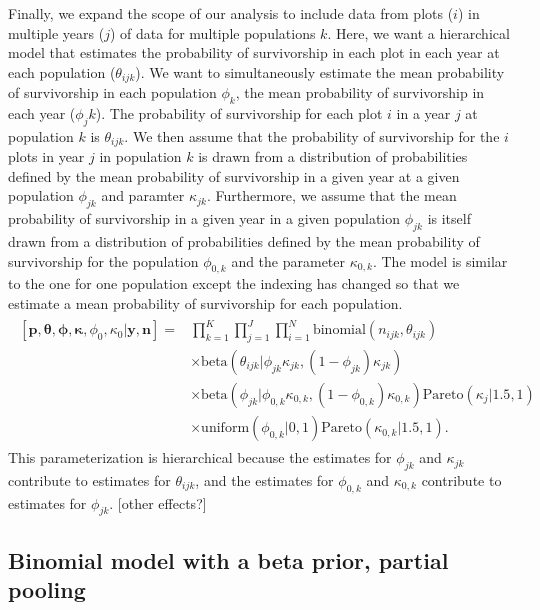 \documentclass[12pt, oneside, titlepage]{article}   	%
\begin{document}
Finally, we expand the scope of our analysis to include data from plots ($i$) in multiple years ($j$) of data for multiple populations $k$. Here, we want a hierarchical model that estimates the probability of survivorship in each plot in each year at each population ($\theta_{ijk}$). We want to simultaneously estimate the mean probability of survivorship in each population $\phi_k$, the mean probability of survivorship in each year ($\phi_jk$). The probability of survivorship for each plot $i$ in a year $j$ at population $k$ is $\theta_{ijk}$. We then assume that the probability of survivorship for the $i$ plots in year $j$ in population $k$ is drawn from a distribution of probabilities defined by the mean probability of survivorship in a given year at a given population $\phi_{jk}$ and paramter $\kappa_{jk}$. Furthermore, we assume that the mean probability of survivorship in a given year in a given population $\phi_{jk}$ is itself drawn from a distribution of probabilities defined by the mean probability of survivorship for the population $\phi_{0,k}$ and the parameter $\kappa_{0,k}$. The model is similar to the one for one population except the indexing has changed so that we estimate a mean probability of survivorship for each population.
%
\begin{align}
  \begin{split}
[\bm{p},\bm{\theta},\bm{\phi},\bm{\kappa},\phi_0,\kappa_0|\bm{y},\bm{n}]  = & \prod_{k=1}^K\prod_{j=1}^J\prod_{i=1}^N \mathrm{binomial}(n_{ijk},\theta_{ijk}) 
    \\ & \times \mathrm{beta} (  \theta_{ijk} | \phi_{jk} \kappa_{jk} , (1-\phi_{jk}) \kappa_{jk} ) 
    \\ & \times \mathrm{beta} (  \phi_{jk} | \phi_{0,k} \kappa_{0,k} , (1- \phi_{0,k}) \kappa_{0,k} )  \mathrm{Pareto} ( \kappa_j | 1.5, 1 ) 
    \\ & \times \mathrm{uniform} ( \phi_{0,k} | 0 , 1) \mathrm{Pareto} ( \kappa_{0,k} | 1.5, 1 ). 
  \end{split}
\end{align}
%
This parameterization is hierarchical because the estimates for $\phi_{jk}$ and $\kappa_{jk}$ contribute to estimates for $\theta_{ijk}$, and the estimates for $\phi_{0,k} $ and $\kappa_{0,k} $ contribute to estimates for $\phi_{jk}$. [other effects?]

\iffalse
\subsection*{Binomial model with a beta prior, partial pooling}
\end{document}
